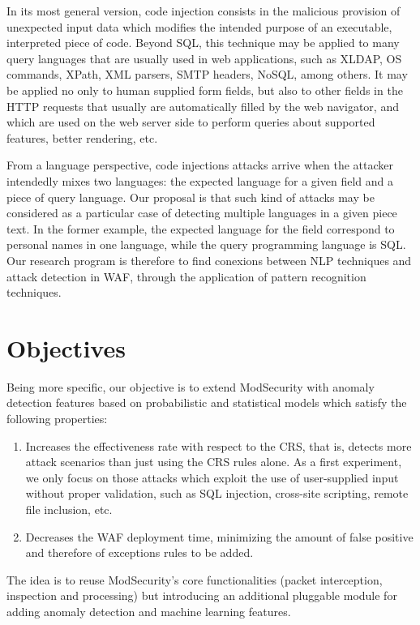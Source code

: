 \documentclass[runningheads,a4paper]{llncs}
\begin{document}
In its most general version, code injection consists in the malicious provision of unexpected input data which modifies the intended purpose of an executable, interpreted piece of code. Beyond SQL, this technique may be applied to many query languages that are usually used in web applications, such as XLDAP, OS commands, XPath, XML parsers, SMTP headers, NoSQL, among others. It may be applied no only to human supplied form fields, but also to other fields in the HTTP requests that usually are automatically filled by the web navigator, and which are used on the web server side to perform queries about supported features, better rendering, etc. 

From a language perspective, code injections attacks arrive when the attacker intendedly mixes two languages: the expected language for a given field and a piece of query language. Our proposal is that such kind of attacks may be considered as a particular case of detecting multiple languages in a given piece text. In the former example, the expected language for the field correspond to personal names in one language, while the query programming language is SQL. Our research program is therefore to find conexions between NLP techniques and attack detection in WAF, through the application of pattern recognition techniques.


\section{Objectives}


Being more specific, our objective is to extend ModSecurity with anomaly detection features based on probabilistic and statistical models which satisfy the following properties:
\begin{enumerate}
\item Increases the effectiveness rate with respect to the CRS, that is, detects more attack scenarios than just using the CRS rules alone. As a first experiment, we only focus on those attacks which exploit the use of user-supplied input without proper validation, such as SQL injection, cross-site scripting, remote file inclusion, etc. 
\item Decreases the WAF deployment time, minimizing the amount of false positive and therefore of exceptions rules to be added.
\end{enumerate}
The idea is to reuse ModSecurity’s core functionalities (packet interception, inspection and processing) but introducing an additional pluggable module for adding anomaly detection and machine learning features.
\end{document}
